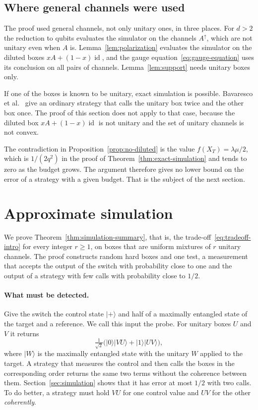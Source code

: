 \documentclass[11pt,letterpaper]{article}
\theoremstyle{definition}\newtheorem{definition}[theorem]{Definition}
\newcommand{\ket}[1]{\lvert#1\rangle}
\newcommand{\id}{\operatorname{id}}
\begin{document}
\subsection{Where general channels were used}\label{sec:where-channels}\label{rem:unitary}

The proof used general channels, not only unitary ones, in three places. For $d>2$ the
reduction to qubits evaluates the simulator on the channels
$A^\uparrow$, which are not unitary even when $A$ is.
Lemma~\ref{lem:polarization} evaluates the simulator on the diluted
boxes $xA+(1-x)\id$, and the gauge equation~\eqref{eq:gauge-equation}
uses its conclusion on all pairs of channels.
Lemma~\ref{lem:support} needs unitary boxes only.

If one of the boxes is known to be unitary, exact simulation is
possible. Bavaresco et al.~\cite[Theorem~1]{bavaresco2025} give an
ordinary strategy that calls the unitary box twice and the other box
once. The proof of this section does not apply to that case, because
the diluted box $xA+(1-x)\id$ is not unitary and the set of unitary
channels is not convex.

The contradiction in Proposition~\ref{prop:no-diluted} is the value
$f(X_T)=\lambda\mu/2$, which is $1/(2q^2)$ in the proof of
Theorem~\ref{thm:exact-simulation} and tends to zero as the budget
grows. The argument
therefore gives no lower bound on the error of a strategy with a given
budget. That is the subject of the next section.

\section{Approximate simulation}\label{sec:approximation}

We prove Theorem~\ref{thm:simulation-summary}, that is, the
trade-off~\eqref{eq:tradeoff-intro} for every integer $r\ge1$, on boxes
that are uniform mixtures of $r$ unitary channels. The proof constructs
random hard boxes and one test, a measurement that accepts the output
of the switch with probability close to one and the output of a
strategy with few calls with probability close to $1/2$.

\paragraph{What must be detected.}
Give the switch the control state $\ket+$ and half of a maximally
entangled state of the target and a reference. We call this input the
probe. For unitary boxes $U$
and $V$ it returns
\[
 \tfrac1{\sqrt2}\bigl(\ket0\ket{VU}+\ket1\ket{UV}\bigr),
\]
where $\ket W$ is the maximally entangled state with the unitary $W$
applied to the target. A strategy that measures the control and then
calls the boxes in the corresponding order returns the same two terms
without the coherence between them. Section~\ref{sec:simulation} shows
that it has error at most $1/2$ with two calls. To do better, a
strategy must hold $VU$ for one control value and $UV$ for the other
\emph{coherently}.
\end{document}
